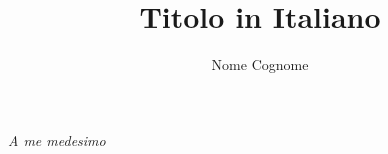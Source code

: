 \documentclass{theme/uniprthesis}
\title{Titolo in Italiano}
\author{Nome Cognome}
\begin{document}
\maketitle

\newpage
\thispagestyle{empty}
\null{}
\begin{flushright}
	\textit{A me medesimo}
\end{flushright}
\null
\newpage

\pagestyle{plain}
\tableofcontents
%
\listoffigures    %
\listofalgorithms %
\listoftables     %
%
%
%

%
\pagestyle{fancy}





%
%
\pagestyle{plain}

%
\cleardoublepage
{}

%

%
\appendix

%
\end{document}
